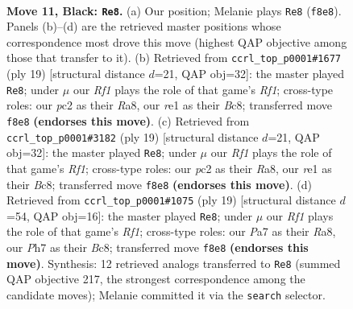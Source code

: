 \documentclass[11pt]{article}
\begin{document}
\begin{figure}[p]\centering
\begin{subfigure}{0.46\textwidth}\centering
\resizebox{\linewidth}{!}{%
\newchessgame
\chessboard[
  setfen={r1bq1rk1/pppp1p1p/3n1bp1/8/8/1PN5/P1PP1PPP/R1BQRBK1 b - - 0 11},
  showmover=false,
  pgfstyle=straightmove, color=movearrow, markmove={f8-e8}
]}
\caption{}
\end{subfigure}\hfill
\begin{subfigure}{0.46\textwidth}\centering
\resizebox{\linewidth}{!}{%
\newchessgame
\chessboard[
  setfen={r1bq1rk1/pppp1ppp/3n1b2/8/8/2N5/PPPP1PPP/R1BQRBK1 b - - 4 10},
  showmover=false,
  pgfstyle=straightmove, color=movearrow, markmove={f8-e8}
]}
\caption{}
\end{subfigure}
\\[4pt]
\begin{subfigure}{0.46\textwidth}\centering
\resizebox{\linewidth}{!}{%
\newchessgame
\chessboard[
  setfen={r1bq1rk1/pppp1ppp/3n1b2/8/8/2N5/PPPP1PPP/R1BQRBK1 b - - 4 10},
  showmover=false,
  pgfstyle=straightmove, color=movearrow, markmove={f8-e8}
]}
\caption{}
\end{subfigure}\hfill
\begin{subfigure}{0.46\textwidth}\centering
\resizebox{\linewidth}{!}{%
\newchessgame
\chessboard[
  setfen={r1bq1rk1/pppp1ppp/3n1b2/8/3P4/8/PPP2PPP/RNBQRBK1 b - - 2 10},
  showmover=false,
  pgfstyle=straightmove, color=movearrow, markmove={f8-e8}
]}
\caption{}
\end{subfigure}
\caption{\textbf{Move 11, Black: \texttt{Re8}.} (a) Our position; Melanie plays \texttt{Re8} (\texttt{f8e8}). Panels (b)--(d) are the retrieved master positions whose correspondence most drove this move (highest QAP objective among those that transfer to it). (b) Retrieved from \texttt{ccrl\_top\_p0001\#1677} (ply 19) [structural distance $d$=21, QAP obj=32]: the master played \texttt{Re8}; under $\mu$ our \emph{Rf1} plays the role of that game's \emph{Rf1}; cross-type roles: our \emph{p}c2 as their \emph{R}a8, our \emph{r}e1 as their \emph{B}c8; transferred move \texttt{f8e8} \textbf{(endorses this move)}. (c) Retrieved from \texttt{ccrl\_top\_p0001\#3182} (ply 19) [structural distance $d$=21, QAP obj=32]: the master played \texttt{Re8}; under $\mu$ our \emph{Rf1} plays the role of that game's \emph{Rf1}; cross-type roles: our \emph{p}c2 as their \emph{R}a8, our \emph{r}e1 as their \emph{B}c8; transferred move \texttt{f8e8} \textbf{(endorses this move)}. (d) Retrieved from \texttt{ccrl\_top\_p0001\#1075} (ply 19) [structural distance $d$=54, QAP obj=16]: the master played \texttt{Re8}; under $\mu$ our \emph{Rf1} plays the role of that game's \emph{Rf1}; cross-type roles: our \emph{P}a7 as their \emph{R}a8, our \emph{P}h7 as their \emph{B}c8; transferred move \texttt{f8e8} \textbf{(endorses this move)}. Synthesis: 12 retrieved analogs transferred to \texttt{Re8} (summed QAP objective 217, the strongest correspondence among the candidate moves); Melanie committed it via the \texttt{search} selector.}
\label{fig:thought-m21}
\end{figure}
\end{document}
